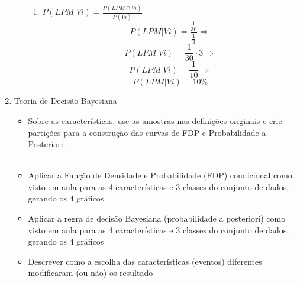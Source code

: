 \documentclass[a4paper, 12pt]{article}
\begin{document}
\begin{enumerate}
\begin{itemize}
\begin{enumerate}
  \item $P(LPM|Vi)=\frac{P(LPM \cap Vi)}{P(Vi)}$
   $$P(LPM|Vi)=\frac{\frac{1}{30}}{\frac{1}{3}} \Rightarrow$$
   $$P(LPM|Vi)=\frac{1}{30}\cdot3 \Rightarrow$$
   $$P(LPM|Vi)=\frac{1}{10} \Rightarrow$$
   $$P(LPM|Vi)=10\% $$
     
  \end{enumerate}
  

\end{itemize}
\item Teoria de Decisão Bayesiana
  \begin{itemize}
  \item Sobre as características, use as amostras nas definições originais e crie partições para a construção das curvas de FDP e Probabilidade a Posteriori.\\\\
    
    
  \item Aplicar a Função de Densidade e Probabilidade (FDP) condicional como visto em aula para as 4 características e 3 classes do conjunto de dados, gerando os 4 gráficos
  \item Aplicar a regra de decisão Bayesiana (probabilidade a posteriori) como visto em aula para as 4 características e 3 classes do conjunto de dados, gerando os 4 gráficos
  \item Descrever como a escolha das características (eventos) diferentes modificaram (ou não) os resultado
    
  \end{itemize}

\end{enumerate}
\end{document}
